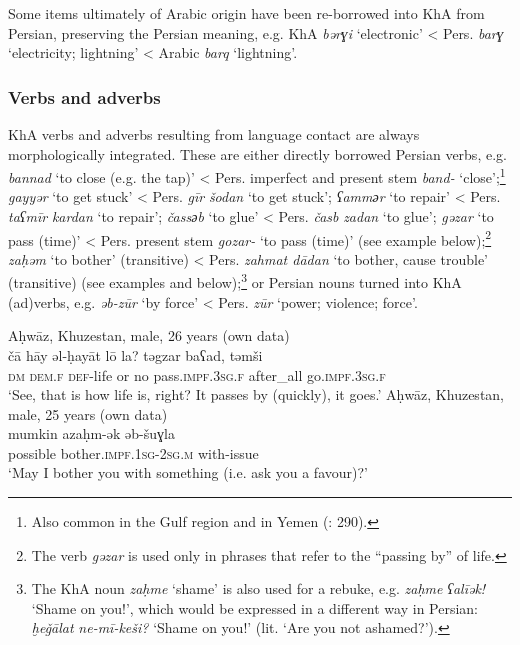 \documentclass[output=paper,nonflat]{langsci/langscibook}
\begin{document}
Some items ultimately of Arabic origin have been re-borrowed into KhA from Persian, preserving the Persian meaning, e.g. KhA \textit{bərɣi} ‘electronic’ < Pers. \textit{barɣ} ‘electricity; lightning’ < Arabic \textit{barq} ‘lightning’. 


\subsubsection{Verbs and adverbs} 

KhA verbs and adverbs resulting from language contact are always morphologically integrated. These are either directly borrowed Persian verbs, e.g. \textit{bannad} ‘to close (e.g. the tap)’ < Pers. imperfect and present stem \textit{band-} ‘close’;\footnote{Also common in the Gulf region and in Yemen (\citealt{BehnstedtWoidich2014}: 290).} \textit{gayyər} ‘to get stuck’ <  Pers. \textit{gīr} \textit{šodan} ‘to get stuck’; \textit{ʕamm{әr}} ‘to repair’ < Pers. \textit{taʕmīr} \textit{kardan} ‘to repair’; \textit{čass{әb}} ‘to glue’ < Pers. \textit{časb} \textit{zadan} ‘to glue’; \textit{gəzar} ‘to pass (time)’ < Pers. present stem \textit{gozar-} ‘to pass (time)’ (see example  below);\footnote{The verb \textit{gəzar} is used only in phrases that refer to the “passing by” of life.} \textit{zaḥəm} ‘to bother’ (transitive) < Pers. \textit{zahmat dādan} ‘to bother, cause trouble’ (transitive) (see examples  and  below);\footnote{The KhA noun \textit{zaḥme} `shame' is also used for a rebuke, e.g. \textit{zaḥme} \textit{ʕalīək!} ‘Shame on you!’, which would be expressed in a different way in Persian: \textit{ḫeǧālat} \textit{ne-mī-keši?} ‘Shame on you!' (lit. ‘Are you not ashamed?’).} or Persian nouns turned into KhA (ad)verbs, e.g. \textit{əb-zūr} ‘by force’ < Pers. \textit{zūr} ‘power; violence; force’.

\ea
{Aḥwāz, Khuzestan, male, 26 years (own data)}\\ \label{ca}
\gll čā hāy əl-ḥayāt lō la? təgzar baʕad, təmši\\
     \textsc{dm} \textsc{dem}.\textsc{f} \textsc{def}{}-life or no pass.\textsc{impf}.\textsc{3sg.f} after\_all go.\textsc{impf.3sg.f}\\
\glt ‘See, that is how life is, right? It passes by (quickly), it goes.’
\z
{}
\ea \label{mumkin}
{Aḥwāz, Khuzestan, male, 25 years (own data)}\\
\gll mumkin azaḥm-ək əb-šuɣla\\
     possible bother.\textsc{impf}.\textsc{1sg}{}-\textsc{2sg.m} with-issue\\
\glt ‘May I bother you with something (i.e. ask you a favour)?’
\z
\end{document}
